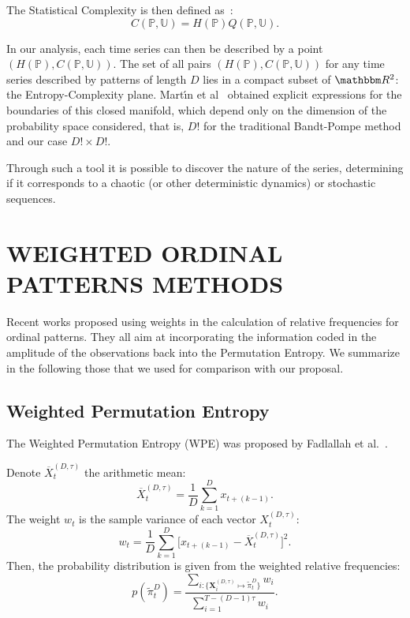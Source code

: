 \documentclass[journal]{IEEEtran}
\begin{document}
The Statistical Complexity is then defined as~\cite{Lamberti2004Entropic}:
\begin{equation}
C(\mathbb{P}, \mathbb{U}) = H(\mathbb{P}) Q(\mathbb{P}, \mathbb{U}).
\end{equation}

In our analysis, each time series can then be described by a point $(H(\mathbb{P}), C(\mathbb{P}, \mathbb{U}))$.
The set of all pairs $(H(\mathbb{P}), C(\mathbb{P}, \mathbb{U}))$ for any time series described by patterns of length $D$ lies in a compact subset of $\mathbbm R^2$: the Entropy-Complexity plane.
Mart\'{\i}n et al~\cite{martin2006generalized} obtained explicit expressions for the boundaries of this closed manifold, which depend only on the dimension of the probability space considered, that is, $D!$ for the traditional Bandt-Pompe method and our case $D! \times D!$.

Through such a tool it is possible to discover the nature of the series, determining if it corresponds to a chaotic (or other deterministic dynamics) or stochastic sequences.

\section{WEIGHTED ORDINAL PATTERNS METHODS}\label{Methods}

Recent works proposed using weights in the calculation of relative frequencies for ordinal patterns.
They all aim at incorporating the information coded in the amplitude of the observations back into the Permutation Entropy.
We summarize in the following those that we used for comparison with our proposal.

\subsection{Weighted Permutation Entropy}\label{WPE}

The Weighted Permutation Entropy (WPE) was proposed by Fadlallah et al.~\cite{Fadlallah2013Weightedpermutation}. 

Denote $\overline{X}_t^{(D, \tau)}$ the arithmetic mean:
\begin{equation}
\overline{X}_t^{(D, \tau)} = \frac{1}{D} \sum_{k = 1}^{D} x_{t + (k - 1)}.
\end{equation}
The weight $w_{t}$ is the sample variance of each vector $X_t^{(D, \tau)}$:
\begin{equation}
w_{t} = \frac{1}{D} \sum_{k = 1}^{D}\big[x_{t + (k - 1)} - \overline{X}_t^{(D, \tau)}\big]^2 .
\end{equation}
Then, the probability distribution is given from the weighted relative frequencies:
\begin{equation}
p(\widetilde \pi_t^D) = \frac{\sum_{i : \{\mathbf{X}^{(D,\tau)}_i \mapsto \widetilde\pi^D_t\}} w_{i}}{\sum_{i = 1}^{T-(D-1)\tau} w_{i}}.
\end{equation}
\end{document}
